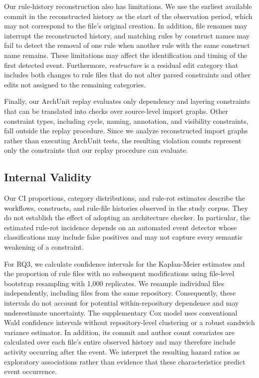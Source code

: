 Our rule-history reconstruction also has limitations. We use the
earliest available commit in the reconstructed history as the
start of the observation period, which may not correspond to the
file's original creation. In addition, file renames may interrupt
the reconstructed history, and matching rules by construct names
may fail to detect the removal of one rule when another rule with
the same construct name remains. These limitations may affect
the identification and timing of the first detected event.
Furthermore, \emph{restructure} is a residual edit category that
includes both changes to rule files that do not alter parsed
constraints and other edits not assigned to the remaining
categories.

Finally, our ArchUnit replay evaluates only dependency and
layering constraints that can be translated into checks over
source-level import graphs. Other constraint types, including
cycle, naming, annotation, and visibility constraints, fall
outside the replay procedure. Since we analyze reconstructed
import graphs rather than executing ArchUnit tests, the resulting
violation counts represent only the constraints that our replay
procedure can evaluate.

\subsection{Internal Validity}
\label{sec:threats-internal}

Our CI proportions, category distributions, and rule-rot estimates
describe the workflows, constructs, and rule-file histories
observed in the study corpus. They do not establish the effect
of adopting an architecture checker. In particular, the estimated
rule-rot incidence depends on an automated event detector whose
classifications may include false positives and may not capture
every semantic weakening of a constraint.

For RQ3, we calculate confidence intervals for the
Kaplan-Meier estimates and the proportion of rule files
with no subsequent modifications using file-level
bootstrap resampling with 1,000 replicates. We resample
individual files independently, including files from the
same repository. Consequently, these intervals do not
account for potential within-repository dependence and
may underestimate uncertainty. The supplementary Cox
model uses conventional Wald confidence intervals without
repository-level clustering or a robust sandwich variance
estimator. In addition, its commit and author count
covariates are calculated over each file's entire observed
history and may therefore include activity occurring
after the event. We interpret the resulting hazard ratios
as exploratory associations rather than evidence that
these characteristics predict event occurrence.

